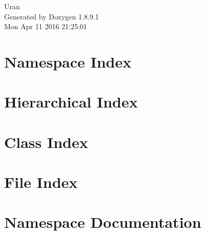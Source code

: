 \documentclass[twoside]{book}
\newcommand{\+}{\discretionary{\mbox{\scriptsize$\hookleftarrow$}}{}{}}
\newcommand{\clearemptydoublepage}{%
  \newpage{\pagestyle{empty}\cleardoublepage}%
}
\begin{document}
\hypersetup{pageanchor=false,
             bookmarks=true,
             bookmarksnumbered=true,
             pdfencoding=unicode
            }
\begin{titlepage}
\vspace*{7cm}
\begin{center}%
{\Large Uran }\\
\vspace*{1cm}
{\large Generated by Doxygen 1.8.9.1}\\
\vspace*{0.5cm}
{\small Mon Apr 11 2016 21:25:01}\\
\end{center}
\end{titlepage}
\clearemptydoublepage
\tableofcontents
\clearemptydoublepage
{}
\hypersetup{pageanchor=true}

\chapter{Namespace Index}

\chapter{Hierarchical Index}

\chapter{Class Index}

\chapter{File Index}

\chapter{Namespace Documentation}















\end{document}
